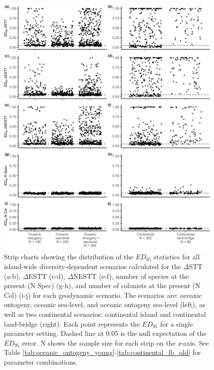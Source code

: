 \begin{figure}
    \centering
    \includegraphics[width=\textwidth]{JBI-21-0508_FigS5.png}
    \caption{Strip charts showing the distribution of the $ED_{95}$ statistics for all island-wide diversity-dependent scenarios calculated for the $\Delta$STT (a-b), $\Delta$ESTT (c-d), $\Delta$NESTT (e-f), number of species at the present (N Spec) (g-h), and number of colonists at the present (N Col) (i-j) for each geodynamic scenario. The scenarios are: oceanic ontogeny, oceanic sea-level, and oceanic ontogeny sea-level (left), as well as two continental scenarios: continental island and continental land-bridge (right). Each point represents the $ED_{95}$ for a single parameter setting. Dashed line at 0.05 is the null expectation of the $ED_{95}$ error. N shows the sample size for each strip on the \textit{x}-axis. See Table \ref{tab:oceanic_ontogeny_young}-\ref{tab:continental_lb_old} for parameter combinations.}
    \label{fig:facet_scenario_iw}
\end{figure}

